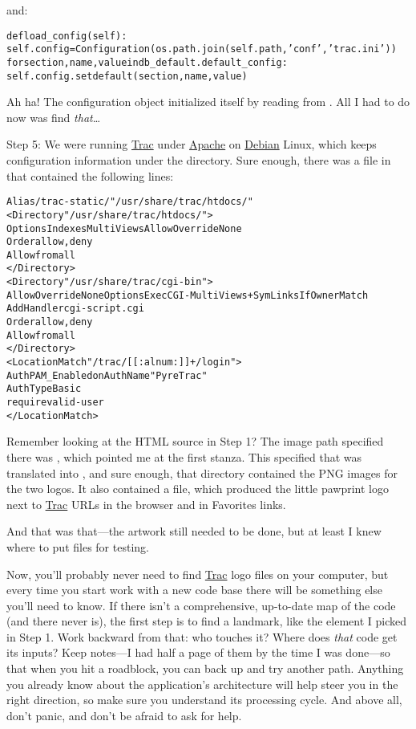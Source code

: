 \documentclass{report}
\begin{document}
\noindent and:

\begin{alltt}
def load_config(self):
    self.config = Configuration(os.path.join(self.path, 'conf', 'trac.ini'))
    for section,name,value in db_default.default_config:
        self.config.setdefault(section, name, value)
\end{alltt}

Ah ha!  The configuration object initialized itself by reading from
.  All I had to do now was find \emph{that}{\ldots}

Step 5: We were running \url{Trac} under \url{Apache} on \url{Debian}
Linux, which keeps configuration information under the
 directory.  Sure enough, there was a
 file in  that contained the following lines:

\begin{alltt}
Alias /trac-static/ "/usr/share/trac/htdocs/"
<Directory "/usr/share/trac/htdocs/">
    Options Indexes MultiViews AllowOverride None
    Order allow,deny
    Allow from all
</Directory>
<Directory "/usr/share/trac/cgi-bin">
    AllowOverride None Options ExecCGI -MultiViews +SymLinksIfOwnerMatch
    AddHandler cgi-script .cgi
    Order allow,deny
    Allow from all
</Directory>
<LocationMatch "/trac/[[:alnum:]]+/login">
    AuthPAM_Enabled on AuthName "Pyre Trac"
    AuthType Basic
    require valid-user
</LocationMatch>
\end{alltt}

Remember looking at the HTML source in Step 1?  The image path
specified there was , which
pointed me at the first stanza.  This specified that
 was translated into ,
and sure enough, that directory contained the PNG images for the two
logos.  It also contained a  file, which produced the
little pawprint logo next to \url{Trac} URLs in the browser and in
Favorites links.

And that was that---the artwork still needed to be done, but at least
I knew where to put files for testing.

Now, you'll probably never need to find \url{Trac} logo files on your
computer, but every time you start work with a new code base there
will be something else you'll need to know.  If there isn't a
comprehensive, up-to-date map of the code (and there never is), the
first step is to find a landmark, like the  element I picked
in Step 1.  Work backward from that: who touches it?  Where does
\emph{that} code get its inputs?  Keep notes---I had half a page of
them by the time I was done---so that when you hit a roadblock, you
can back up and try another path.  Anything you already know about the
application's architecture will help steer you in the right direction,
so make sure you understand its processing cycle.  And above all,
don't panic, and don't be afraid to ask for help.
\end{document}
